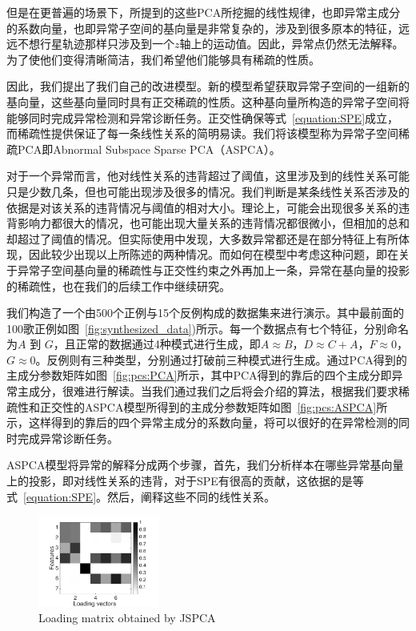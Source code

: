 但是在更普遍的场景下，所提到的这些PCA所挖掘的线性规律，也即异常主成分的系数向量，也即异常子空间的基向量是非常复杂的，涉及到很多原本的特征，远远不想行星轨迹那样只涉及到一个$z$轴上的运动值。因此，异常点仍然无法解释。为了使他们变得清晰简洁，我们希望他们能够具有稀疏的性质。

因此，我们提出了我们自己的改进模型。新的模型希望获取异常子空间的一组新的基向量，这些基向量同时具有正交稀疏的性质。这种基向量所构造的异常子空间将能够同时完成异常检测和异常诊断任务。正交性确保等式~\ref{equation:SPE}成立，而稀疏性提供保证了每一条线性关系的简明易读。我们将该模型称为异常子空间稀疏PCA即Abnormal Subspace Sparse PCA（ASPCA）。

对于一个异常而言，他对线性关系的违背超过了阈值，这里涉及到的线性关系可能只是少数几条，但也可能出现涉及很多的情况。我们判断是某条线性关系否涉及的依据是对该关系的违背情况与阈值的相对大小。理论上，可能会出现很多关系的违背影响力都很大的情况，也可能出现大量关系的违背情况都很微小，但相加的总和却超过了阈值的情况。但实际使用中发现，大多数异常都还是在部分特征上有所体现，因此较少出现以上所陈述的两种情况。而如何在模型中考虑这种问题，即在关于异常子空间基向量的稀疏性与正交性约束之外再加上一条，异常在基向量的投影的稀疏性，也在我们的后续工作中继续研究。 

我们构造了一个由500个正例与15个反例构成的数据集来进行演示。其中最前面的100歌正例如图~\ref{fig:synthesized_data})所示。每一个数据点有七个特征，分别命名为$A$ 到 $G$，且正常的数据通过4种模式进行生成，即$A \approx B$，$D \approx C + A$，$F \approx 0$，$G \approx 0$。反例则有三种类型，分别通过打破前三种模式进行生成。通过PCA得到的主成分参数矩阵如图~\ref{fig:pcs:PCA}所示，其中PCA得到的靠后的四个主成分即异常主成分，很难进行解读。当我们通过我们之后将会介绍的算法，根据我们要求稀疏性和正交性的ASPCA模型所得到的主成分参数矩阵如图~\ref{fig:pcs:ASPCA}所示，这样得到的靠后的四个异常主成分的系数向量，将可以很好的在异常检测的同时完成异常诊断任务。

ASPCA模型将异常的解释分成两个步骤，首先，我们分析样本在哪些异常基向量上的投影，即对线性关系的违背，对于SPE有很高的贡献，这依据的是等式~\ref{equation:SPE}。然后，阐释这些不同的线性关系。

\begin{figure}
	\centering
	\includegraphics[height=30mm]{figure/new/Synthetic-Components-JSPCA}
\caption{Loading matrix obtained by JSPCA}
\label{fig:loading matrix:synthetic}
\end{figure}

